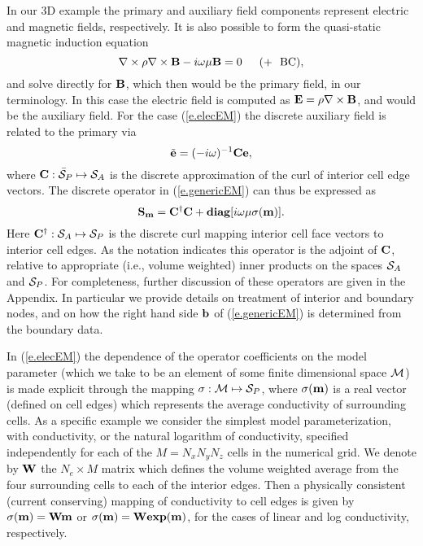 In our 3D example the primary and auxiliary
field components represent electric and magnetic fields, respectively.
It is also possible to form the quasi-static magnetic induction equation 
\begin{equation}
\label{e.IndB}
\nabla \times \rho \nabla \times  {\bf B} - i \omega \mu {\bf B} = 0
\,\,\,\,\,\,\,\,\, ( + \,\,\,\, {\rm BC}) ,
\end{equation}
and solve directly for ${\bf B}$, which then would 
be the primary field, in our terminology.
In this case the electric field is computed as
${\bf E} = \rho\nabla\times{\bf B}$, and would be the auxiliary field.
For the case (\ref{e.elecEM}) the discrete auxiliary field
is related to the primary via 
\begin{equation}
\tilde {{\bf e}} = (-i\omega)^{-1} {\bf C} {\bf e} ,
\end{equation}
where ${\bf C}:\bar{\cal S}_P \mapsto {\cal S}_A$ is the discrete approximation
of the curl of interior cell edge vectors.  The discrete
operator in (\ref{e.genericEM}) can thus be expressed as
\begin{equation}
\label{e.elecEM}
{\bf S}_{{\bf m}} = {\bf C}^{\dag}{\bf C} + {\bf diag} [i \omega \mu \sigma ({\bf m})] .
\end{equation}
Here ${\bf C}^\dag:{\cal S}_A \mapsto {\cal S}_P$ is the discrete curl
mapping interior cell face vectors to interior cell edges.
As the notation indicates this operator is the
adjoint of ${\bf C}$, relative to appropriate (i.e., volume
weighted) inner products on the
spaces ${\cal S}_A$ and ${\cal S}_P$.  For completeness,
further discussion of these operators are given in the Appendix.
In particular we provide details on treatment of interior and boundary nodes,
and on how the right hand side  ${\bf b}$ of (\ref{e.genericEM})
is determined from the boundary data.

In (\ref{e.elecEM}) the dependence
of the operator coefficients on the model parameter
(which we take to be an element of some finite dimensional
space $\cal M$)
is made explicit through the mapping
$\sigma : {\cal M} \mapsto {\cal S}_P$,
where $\sigma({\bf m})$ is a real vector (defined on
cell edges) which
represents the average conductivity of surrounding cells.
As a specific example we consider the simplest
model parameterization, with conductivity, or the natural
logarithm of conductivity, specified independently for each of the
$M = N_x N_y N_z$ cells in the numerical grid.
We denote by ${\bf W}$ the $N_e \times M$ matrix which defines
the volume weighted average from the
four surrounding cells to each of the interior edges.
Then a physically consistent (current conserving)
mapping of conductivity to cell edges is given by
$\sigma ({\bf m}) = {\bf W} {\bf m} $ or $\sigma({\bf m})={\bf W} {\bf exp} ({\bf m})$,
for the cases of linear and log conductivity, respectively.

